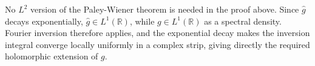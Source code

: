 \documentclass[11pt]{amsart}
\theoremstyle{plain}
\newtheorem{lemma}[theorem]{Lemma}
\theoremstyle{definition}
\newtheorem{remark}[theorem]{Remark}
\numberwithin{equation}{section}
\begin{document}
No $L^2$ version of the Paley-Wiener theorem is needed in the proof above. Since $\widehat{g}$ decays exponentially, $\widehat{g}\in L^1(\mathbb R)$, while $g\in L^1(\mathbb R)$ as a spectral density. Fourier inversion therefore applies, and the exponential decay makes the inversion integral converge locally uniformly in a complex strip, giving directly the required holomorphic extension of $g$.

\end{document}
